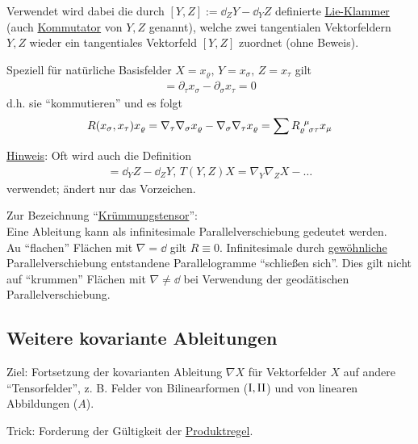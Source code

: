 Verwendet wird dabei die durch \([Y,Z] := \dd_Z Y - \dd_Y Z\) definierte \uline{Lie-Klammer} (auch \uline{Kommutator} von \(Y,Z\) genannt), welche zwei tangentialen Vektorfeldern \(Y,Z\) wieder ein tangentiales Vektorfeld \([Y,Z]\) zuordnet (ohne Beweis). \par

Speziell für natürliche Basisfelder \(X = x_\varrho, \, Y = x_\sigma, \, Z = x_\tau\) gilt
\begin{align*}
[x_\sigma, x_\tau] = \partial_\tau x_\sigma - \partial_\sigma x_\tau = 0 
\end{align*}
d.h. sie "`kommutieren"' und es folgt
\begin{align*}
 R(x_\sigma, x_\tau) x_\varrho = \nabla_\tau \nabla_\sigma x_\varrho - \nabla_\sigma \nabla_\tau x_\varrho = \sum R_{\varrho \;\, \sigma \tau}^{\;\, \mu} x_\mu
\end{align*}

\uline{Hinweis}: Oft wird auch die Definition
\begin{align*}
 [Y,Z] = \dd_Y Z - \dd_Z Y, \, T(Y,Z)X = \nabla_Y \nabla_Z X - \dots
\end{align*}
verwendet; ändert nur das Vorzeichen. \par

Zur Bezeichnung "`\uline{Krümmungstensor}"': \\
Eine Ableitung kann als infinitesimale Parallelverschiebung gedeutet werden. \\
Au "`flachen"' Flächen mit \(\nabla = \dd\) gilt \(R \equiv 0\). Infinitesimale durch \uline{gewöhnliche} Parallelverschiebung entstandene Parallelogramme "`schließen sich"'. Dies gilt nicht auf "`krummen"' Flächen mit \(\nabla \ne \dd\) bei Verwendung der geodätischen Parallelverschiebung.

\subsection{Weitere kovariante Ableitungen}
Ziel: Fortsetzung der kovarianten Ableitung \(\nabla X\) für Vektorfelder \(X\) auf andere "`Tensorfelder"', z. B. Felder von Bilinearformen (\(\Rom1, \Rom2\)) und von linearen Abbildungen (\(A\)). \par
Trick: Forderung der Gültigkeit der \uline{Produktregel}.

